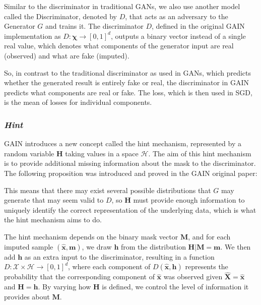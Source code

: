 Similar to the discriminator in traditional GANs, we also use another model called the Discriminator, denoted by \( D \), that acts as an adversary to the Generator \( G \) and trains it. The discriminator \( D \), defined in the original GAIN implementation as \( D: \mathbf{\chi} \rightarrow [0,1]^d \), outputs a binary vector instead of a single real value, which denotes what components of the generator input are real (observed) and what are fake (imputed). 

So, in contrast to the traditional discriminator as used in GANs, which predicts whether the generated result is entirely fake or real, the discriminator in GAIN predicts what components are real or fake. The loss, which is then used in SGD, is the mean of losses for individual components.

\subsubsection{\textit{Hint}}
GAIN introduces a new concept called the hint mechanism, represented by a random variable \( \mathbf{H} \) taking values in a space \( \mathcal{H} \). The aim of this hint mechanism is to provide additional missing information about the mask to the discriminator. The following proposition was introduced and proved in the GAIN\cite{gain} original paper:


This means that there may exist several possible distributions that \( G \) may generate that may seem valid to \( D \), so \( \mathbf{H} \) must provide enough information to uniquely identify the correct representation of the underlying data, which is what the hint mechanism aims to do.

The hint mechanism depends on the binary mask vector \( \mathbf{M} \), and for each imputed sample \( (\hat{\mathbf{x}}, \mathbf{m}) \), we draw \( \mathbf{h} \) from the distribution \( \mathbf{H} | \mathbf{M} = \mathbf{m} \). We then add \( \mathbf{h} \) as an extra input to the discriminator, resulting in a function \( D: \mathcal{X} \times \mathcal{H} \rightarrow [0, 1]^d \), where each component of \( D(\hat{\mathbf{x}}, \mathbf{h}) \) represents the probability that the corresponding component of \( \hat{\mathbf{x}} \) was observed given \( \hat{\mathbf{X}} = \hat{\mathbf{x}} \) and \( \mathbf{H} = \mathbf{h} \).
By varying how \( \mathbf{H} \) is defined, we control the level of information it provides about \( \mathbf{M} \).

